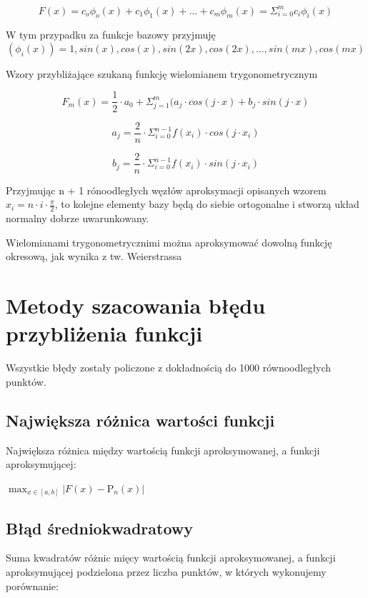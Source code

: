 \documentclass{article}
\begin{document}
\[F(x) = c_o\phi_o(x) + c_1\phi_1(x) + ... + c_m\phi_m(x) = \Sigma_{i=0}^{m}c_i\phi_i(x)\]

\noindent
W tym przypadku za funkcje bazowy przyjmuję
\[(\phi_i(x)) = 1, sin(x), cos(x), sin(2x), cos(2x), ..., sin(mx), cos(mx)\]

\noindent
Wzory przybliżające szukaną funkcję wielomianem trygonometrycznym

\[F_m(x) = \frac{1}{2} \cdot a_0 + \Sigma_{j=1}^{m}(a_j \cdot cos(j \cdot x) + b_j \cdot sin(j \cdot x)\]

\[a_j = \frac{2}{n} \cdot \Sigma_{i=0}^{n-1}f(x_i) \cdot cos(j \cdot x_i)\]

\[b_j = \frac{2}{n} \cdot \Sigma_{i=0}^{n-1}f(x_i) \cdot sin(j \cdot x_i)\]

\noindent
Przyjmując n + 1 rónoodległych węzłów aproksymacji opisanych wzorem \(x_i = n \cdot i \cdot \frac{\pi}{2}\), to kolejne elementy bazy będą do siebie ortogonalne i stworzą układ normalny dobrze uwarunkowany.

\noindent
Wielomianami trygonometrycznimi można aproksymować dowolną funkcję okresową, jak wynika z tw. Weierstrassa

\newpage

\section{Metody szacowania błędu przybliżenia funkcji}

Wszystkie błędy zostały policzone z dokładnością do 1000 równoodległych punktów.

\subsection{Największa różnica wartości funkcji}

Największa różnica między wartością funkcji aproksymowanej, a funkcji aproksymującej:

\begin{center}
    \(\max_{x\in [a, b]} |F(x) - \mathrm{P}_{n}^{}(x)|\)
\end{center}

\subsection{Błąd średniokwadratowy}

Suma kwadratów różnic mięcy wartością funkcji aproksymowanej, a funkcji aproksymującej podzielona przez liczba punktów, w których wykonujemy porównanie:
\end{document}
